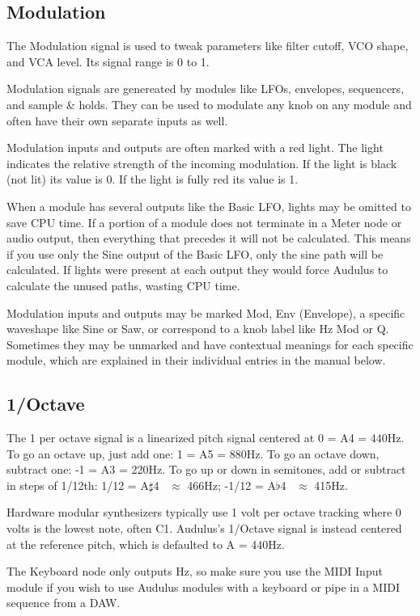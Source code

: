 \documentclass[11pt]{book}
\begin{document}
\begin{multicols*}{2}
\subsection{Modulation}

The Modulation signal is used to tweak parameters like filter cutoff, VCO shape, and VCA level. Its signal range is 0 to 1. 

Modulation signals are genereated by modules like LFOs, envelopes, sequencers, and sample \& holds. They can be used to modulate any knob on any module and often have their own separate inputs as well.

Modulation inputs and outputs are often marked with a red light. The light indicates the relative strength of the incoming modulation. If the light is black (not lit) its value is 0. If the light is fully red its value is 1.

When a module has several outputs like the Basic LFO, lights may be omitted to save CPU time. If a portion of a module does not terminate in a Meter node or audio output, then everything that precedes it will not be calculated. This means if you use only the Sine output of the Basic LFO, only the sine path will be calculated. If lights were present at each output they would force Audulus to calculate the unused paths, wasting CPU time.

Modulation inputs and outputs may be marked Mod, Env (Envelope), a specific waveshape like Sine or Saw, or correspond to a knob label like Hz Mod or Q. Sometimes they may be unmarked and have contextual meanings for each specific module, which are explained in their individual entries in the manual below.

\subsection{1/Octave}

The 1 per octave signal is a linearized pitch signal centered at 0 = A4 = 440Hz. To go an octave up, just add one: 1 = A5 = 880Hz. To go an octave down, subtract one: -1 = A3 = 220Hz. To go up or down in semitones, add or subtract in steps of 1/12th: 1/12 = A$\sharp$4 \ $\approx$ 466Hz; -1/12 = A$\flat$4 \ $\approx$ 415Hz. 

Hardware modular synthesizers typically use 1 volt per octave tracking where 0 volts is the lowest note, often C1. Audulus's 1/Octave signal is instead centered at the reference pitch, which is defaulted to A = 440Hz. 

The Keyboard node only outputs Hz, so make sure you use the MIDI Input module if you wish to use Audulus modules with a keyboard or pipe in a MIDI sequence from a DAW.


\end{multicols*}
\end{document}
